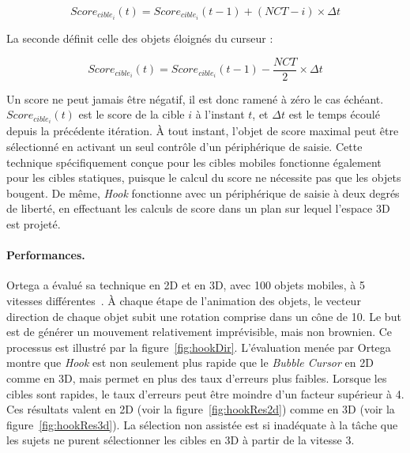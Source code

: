 	$$ Score_{cible_{i}}(t) = Score_{cible_{i}}(t-1) + (NCT - i) \times \Delta{}t $$
	
	La seconde définit celle des objets éloignés du curseur :
	
	$$ Score_{cible_{i}}(t) = Score_{cible_{i}}(t-1) - \frac{NCT}{2} \times \Delta{}t $$
	
	Un score ne peut jamais être négatif, il est donc ramené à zéro le cas échéant. $Score_{cible_{i}}(t)$ est le score de la cible $i$ à l'instant $t$, et $\Delta{}t$ est le temps écoulé depuis la précédente itération. À tout instant, l'objet de score maximal peut être sélectionné en activant un seul contrôle d'un périphérique de saisie. Cette technique spécifiquement conçue pour les cibles mobiles fonctionne également pour les cibles statiques, puisque le calcul du score ne nécessite pas que les objets bougent. De même, \emph{Hook} fonctionne avec un périphérique de saisie à deux degrés de liberté, en effectuant les calculs de score dans un plan sur lequel l'espace 3D est projeté.
	
	\paragraph{Performances.}
	Ortega a évalué sa technique en 2D et en 3D, avec 100 objets mobiles, à 5 vitesses différentes~\cite{ortega2013hook}. À chaque étape de l'animation des objets, le vecteur direction de chaque objet subit une rotation comprise dans un cône de 10\textdegree. Le but est de générer un mouvement relativement imprévisible, mais non brownien. Ce processus est illustré par la figure~\ref{fig:hookDir}. L'évaluation menée par Ortega montre que \emph{Hook} est non seulement plus rapide que le \emph{Bubble Cursor} en 2D comme en 3D, mais permet en plus des taux d'erreurs plus faibles. Lorsque les cibles sont rapides, le taux d'erreurs peut être moindre d'un facteur supérieur à 4. Ces résultats valent en 2D (voir la figure~\ref{fig:hookRes2d}) comme en 3D (voir la figure~\ref{fig:hookRes3d}). La sélection non assistée est si inadéquate à la tâche que les sujets ne purent sélectionner les cibles en 3D à partir de la vitesse 3.

